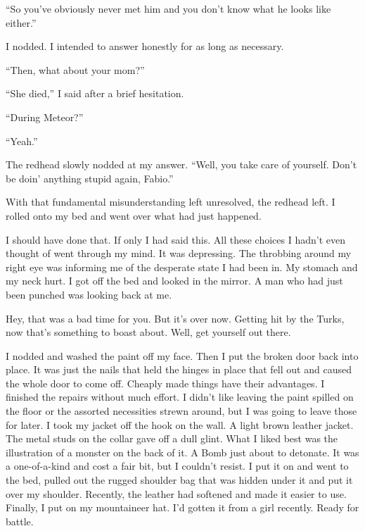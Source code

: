 \documentclass[oneside]{book}
\begin{document}
“So you’ve obviously never met him and you don’t know what he looks like either.”

I nodded. I intended to answer honestly for as long as necessary.

“Then, what about your mom?”

“She died,” I said after a brief hesitation.

“During Meteor?”

“Yeah.”

The redhead slowly nodded at my answer. “Well, you take care of yourself. Don’t be doin’ anything stupid again, Fabio.”

With that fundamental misunderstanding left unresolved, the redhead left. I rolled onto my bed and went over what had just happened.

I should have done that. If only I had said this. All these choices I hadn’t even thought of went through my mind. It was depressing. The throbbing around my right eye was informing me of the desperate state I had been in. My stomach and my neck hurt. I got off the bed and looked in the mirror. A man who had just been punched was looking back at me.

Hey, that was a bad time for you. But it’s over now. Getting hit by the Turks, now that’s something to boast about. Well, get yourself out there.

I nodded and washed the paint off my face. Then I put the broken door back into place. It was just the nails that held the hinges in place that fell out and caused the whole door to come off. Cheaply made things have their advantages. I finished the repairs without much effort. I didn’t like leaving the paint spilled on the floor or the assorted necessities strewn around, but I was going to leave those for later. I took my jacket off the hook on the wall. A light brown leather jacket. The metal studs on the collar gave off a dull glint. What I liked best was the illustration of a monster on the back of it. A Bomb just about to detonate. It was a one-of-a-kind and cost a fair bit, but I couldn’t resist. I put it on and went to the bed, pulled out the rugged shoulder bag that was hidden under it and put it over my shoulder. Recently, the leather had softened and made it easier to use. Finally, I put on my mountaineer hat. I’d gotten it from a girl recently. Ready for battle.
\end{document}
